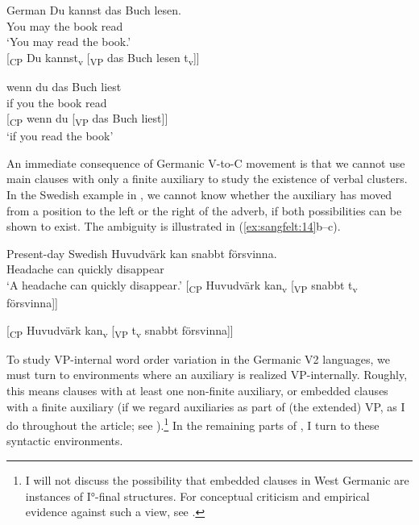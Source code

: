 \documentclass[output=paper, colorlinks, citecolor=brown]{langscibook}
\begin{document}
\ea German\label{ex:sangfelt:13}
\ea\label{ex:sangfelt:13a}
\gll Du kannst das Buch lesen.\\
 You may the book read\\
\glt ‘You may read the book.’\\

[\textsubscript{CP} Du kannst\textsubscript{v} [\textsubscript{VP} {das} {Buch} lesen t\textsubscript{v}]]

\ex\label{ex:sangfelt:13b}
\gll wenn du das Buch liest \\
 if you the book read\\

[\textsubscript{CP} wenn du [\textsubscript{VP} {das} {Buch} liest]]\\

\glt ‘if you read the book’
\z 
\z 

An immediate consequence of Germanic V-to-C movement is that we cannot use main clauses with only a finite auxiliary to study the existence of verbal clusters. In the Swedish example in , we cannot know whether the auxiliary has moved from a position to the left or the right of the adverb, if both possibilities can be shown to exist. The ambiguity is illustrated in (\ref{ex:sangfelt:14}b–c).

\ea Present-day Swedish\label{ex:sangfelt:14}
\ea \label{ex:sangfelt:14a}
\gll Huvudvärk kan {snabbt} försvinna.  \\
 Headache can quickly disappear \\
\glt ‘A headache can quickly disappear.’
\ex\label{ex:sangfelt:14b}
[\textsubscript{CP} Huvudvärk kan\textsubscript{v} [\textsubscript{VP} snabbt t\textsubscript{v} försvinna]]

[\textsubscript{CP} Huvudvärk kan\textsubscript{v} [\textsubscript{VP} t\textsubscript{v} snabbt försvinna]]
\z 
\z

To study VP-internal word order variation in the Germanic V2 languages, we must turn to environments where an auxiliary is realized VP-internally. Roughly, this means clauses with at least one non-finite auxiliary, or embedded clauses with a finite auxiliary (if we regard auxiliaries as part of (the extended) VP, as I do throughout the article; see ).\footnote{I will not discuss the possibility that embedded clauses in West Germanic are instances of I°-final structures. For conceptual criticism and empirical evidence against such a view, see \citet[54–68]{Haider2010}.} In the remaining parts of , I turn to these syntactic environments.
\end{document}
